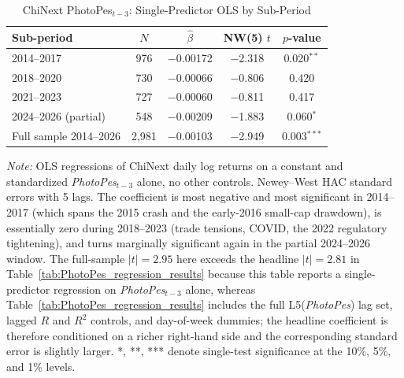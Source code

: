 \documentclass[AER]{AEA}
\begin{document}
\begin{table}[h!]
    \centering
    \caption{ChiNext PhotoPes$_{t-3}$: Single-Predictor OLS by Sub-Period}
    \label{tab:subperiod_beta}
    \setlength{\tabcolsep}{8pt}
    \small
    \begin{tabular}{lcccc}
    \toprule
    Sub-period & $N$ & $\hat\beta$ & NW(5) $t$ & $p$-value \\
    \midrule
    2014--2017               & 976  & $-$0.00172 & $-$2.318 & 0.020$^{**}$  \\
    2018--2020               & 730  & $-$0.00066 & $-$0.806 & 0.420         \\
    2021--2023               & 727  & $-$0.00060 & $-$0.811 & 0.417         \\
    2024--2026 (partial)     & 548  & $-$0.00209 & $-$1.883 & 0.060$^{*}$   \\
    \midrule
    Full sample 2014--2026   & 2{,}981 & $-$0.00103 & $-$2.949 & 0.003$^{***}$ \\
    \bottomrule
    \end{tabular}

    \vspace{0.2cm}
    \footnotesize
    \textit{Note:} OLS regressions of ChiNext daily log returns on a constant and standardized \textit{PhotoPes}$_{t-3}$ alone, no other controls. Newey--West HAC standard errors with 5 lags. The coefficient is most negative and most significant in 2014--2017 (which spans the 2015 crash and the early-2016 small-cap drawdown), is essentially zero during 2018--2023 (trade tensions, COVID, the 2022 regulatory tightening), and turns marginally significant again in the partial 2024--2026 window. The full-sample $|t|=2.95$ here exceeds the headline $|t|=2.81$ in Table~\ref{tab:PhotoPes_regression_results} because this table reports a single-predictor regression on \textit{PhotoPes}$_{t-3}$ alone, whereas Table~\ref{tab:PhotoPes_regression_results} includes the full L5(\textit{PhotoPes}) lag set, lagged $R$ and $R^2$ controls, and day-of-week dummies; the headline coefficient is therefore conditioned on a richer right-hand side and the corresponding standard error is slightly larger. *, **, *** denote single-test significance at the 10\%, 5\%, and 1\% levels.
\end{table}
\end{document}
